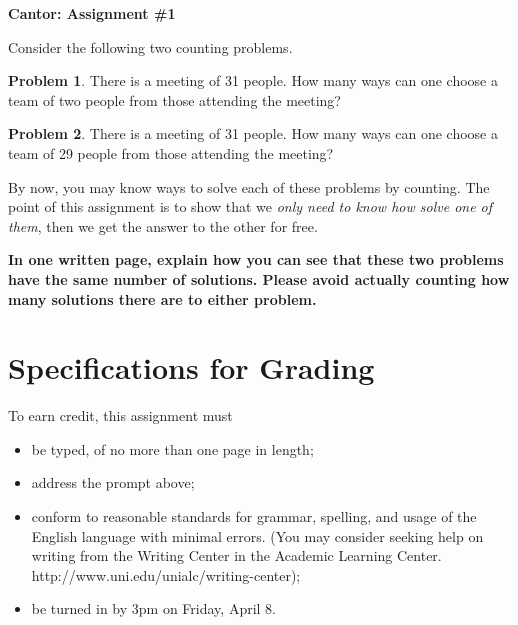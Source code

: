 \documentclass[12pt,letterpaper]{article}
\theoremstyle{definition}
\newtheorem{problem}{Problem}
\begin{document}
\setlength{\parskip}{1ex plus 0.5ex minus 0.2ex}
\setlength{\parindent}{0pt}

\pagestyle{fancy}
\lfoot{}
\rfoot{}

\begin{center}
{
\Large
\textbf{Cantor: Assignment \#1}
}
\end{center}

Consider the following two counting problems. 

\begin{problem}
There is a meeting of 31 people. How many ways can one choose a team of two people from those attending the meeting?
\end{problem}

\begin{problem}
There is a meeting of 31 people. How many ways can one choose a team of 29 people from those attending the meeting?
\end{problem}

By now, you may know ways to solve each of these problems by counting. 
The point of this assignment is to show that we \emph{only need to know how solve one of them}, then we get the answer to the other for free.

\textbf{In one written page, explain how you can see that these two problems have the same number of solutions.  Please avoid actually counting how many solutions there are to either problem.}

\section*{Specifications for Grading}

To earn credit, this assignment must
\begin{itemize}
\item be typed, of no more than one page in length;
\item address the prompt above;
\item conform to reasonable standards for grammar, spelling, and usage of the English language with minimal errors. (You may consider seeking help on writing from the Writing Center in the Academic Learning Center. http://www.uni.edu/unialc/writing-center);
\item be turned in by 3pm on Friday, April 8.
\end{itemize}
\end{document}
